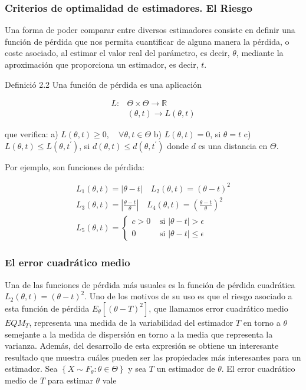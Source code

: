 \documentclass[
]{article}
\begin{document}
\subsubsection{Criterios de optimalidad de estimadores. El Riesgo}\label{criterios-de-optimalidad-de-estimadores.-el-riesgo}

Una forma de poder comparar entre diversos estimadores consiste en definir una función de pérdida que nos permita cuantificar de alguna manera la pérdida, o coste asociado, al estimar el valor real del parámetro, es decir, \(\theta\), mediante la aproximación que proporciona un estimador, es decir, \(t\).

Definició 2.2 Una función de pérdida es una aplicación

\[
\begin{aligned}
L: & \Theta \times \Theta \rightarrow \mathbb{R} \\
& (\theta, t) \rightarrow L(\theta, t)
\end{aligned}
\]

que verifica:
a) \(L(\theta, t) \geq 0, \quad \forall \theta, t \in \Theta\)
b) \(L(\theta, t)=0\), si \(\theta=t\)
c) \(L(\theta, t) \leq L\left(\theta, t^{\prime}\right)\), si \(d(\theta, t) \leq d\left(\theta, t^{\prime}\right)\) donde \(d\) es una distancia en \(\Theta\).

Por ejemplo, son funciones de pérdida:

\[
\begin{gathered}
L_{1}(\theta, t)=|\theta-t| \quad L_{2}(\theta, t)=(\theta-t)^{2} \\
L_{3}(\theta, t)=\left|\frac{\theta-t}{\theta}\right| \quad L_{4}(\theta, t)=\left(\frac{\theta-t}{\theta}\right)^{2} \\
L_{5}(\theta, t)= \begin{cases}c>0 & \text { si }|\theta-t|>\epsilon \\
0 & \text { si }|\theta-t| \leq \epsilon\end{cases}
\end{gathered}
\]

\subsubsection{El error cuadrático medio}\label{el-error-cuadruxe1tico-medio}

Una de las funciones de pérdida más usuales es la función de pérdida cuadrática \(L_{2}(\theta, t)=(\theta-t)^{2}\). Uno de los motivos de su uso es que el riesgo asociado a esta función de pérdida \(E_{\theta}\left[(\theta-T)^{2}\right]\), que llamamos error cuadrático medio \(E Q M_{T}\), representa una medida de la variabilidad del estimador \(T\) en torno a \(\theta\) semejante a la medida de dispersión en torno a la media que representa la varianza.
Además, del desarrollo de esta expresión se obtiene un interesante resultado que muestra cuáles pueden ser las propiedades más interesantes para un estimador.
Sea \(\left\{X \sim F_{\theta}: \theta \in \Theta\right\}\) y sea \(T\) un estimador de \(\theta\). El error cuadrático medio de \(T\) para estimar \(\theta\) vale
\end{document}
